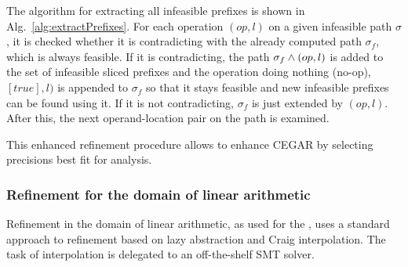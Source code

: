 The algorithm for extracting all infeasible prefixes is shown in Alg.~\ref{alg:extractPrefixes}.
For each operation $(op, l)$ on a given infeasible path $\sigma$, it is checked whether it is contradicting with the already computed path $\sigma_f$, which is always feasible.
If it is contradicting, the path $\sigma_f \wedge (op, l)$ is added to the set of infeasible sliced prefixes
and the operation doing nothing (no-op), $[true], l)$ is appended to $\sigma_f$ so that it stays feasible and new infeasible prefixes can be found using it.
If it is not contradicting, $\sigma_f$ is just extended by $(op, l)$.
After this, the next operand-location pair on the path is examined.

This enhanced refinement procedure allows to enhance CEGAR by selecting precisions best fit for analysis.

\subsubsection*{Refinement for the domain of linear arithmetic}
Refinement in the domain of linear arithmetic, as used for the \predicateCPA, uses a standard approach to refinement based on lazy abstraction and Craig interpolation.
The task of interpolation is delegated to an off-the-shelf SMT solver.


